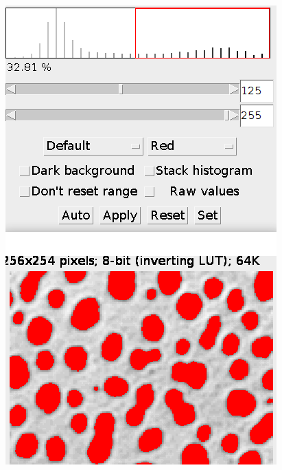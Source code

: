 \documentclass[ignorenonframetext,aspectratio=169,10pt,xcolor=table]{beamer}
\begin{document}
\begin{frame}
\begin{columns}
\begin{column}{0.3\textwidth}
      \includegraphics[width=\textwidth]{threshold}
    \end{column}
  \end{columns}
\end{frame}
\end{document}
